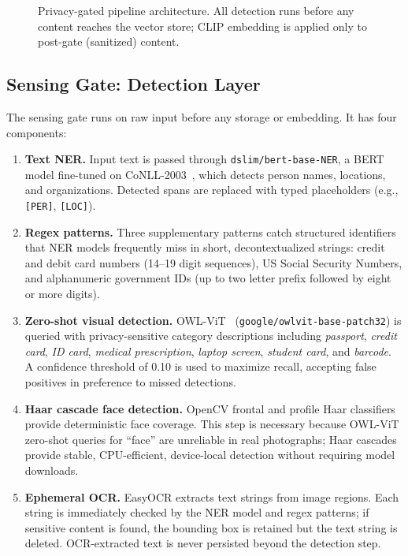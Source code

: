 \documentclass[11pt]{article}
\begin{document}
\begin{figure}[H]
\begin{tikzpicture}
\end{tikzpicture}
\caption{Privacy-gated pipeline architecture. All detection runs before any content reaches the
         vector store; CLIP embedding is applied only to post-gate (sanitized) content.}
\label{fig:pipeline}
\end{figure}

\subsection{Sensing Gate: Detection Layer}

The sensing gate runs on raw input before any storage or embedding. It has four components:

\begin{enumerate}[noitemsep]
    \item \textbf{Text NER.} Input text is passed through \texttt{dslim/bert-base-NER}, a BERT model fine-tuned on CoNLL-2003~\cite{tjong2003}, which detects person names, locations, and organizations. Detected spans are replaced with typed placeholders (e.g., \texttt{[PER]}, \texttt{[LOC]}).

    \item \textbf{Regex patterns.} Three supplementary patterns catch structured identifiers that NER models frequently miss in short, decontextualized strings: credit and debit card numbers (14--19 digit sequences), US Social Security Numbers, and alphanumeric government IDs (up to two letter prefix followed by eight or more digits).

    \item \textbf{Zero-shot visual detection.} OWL-ViT~\cite{owlvit} (\texttt{google/owlvit-base-patch32}) is queried with privacy-sensitive category descriptions including \textit{passport}, \textit{credit card}, \textit{ID card}, \textit{medical prescription}, \textit{laptop screen}, \textit{student card}, and \textit{barcode}. A confidence threshold of 0.10 is used to maximize recall, accepting false positives in preference to missed detections.

    \item \textbf{Haar cascade face detection.} OpenCV frontal and profile Haar classifiers provide deterministic face coverage. This step is necessary because OWL-ViT zero-shot queries for ``face'' are unreliable in real photographs; Haar cascades provide stable, CPU-efficient, device-local detection without requiring model downloads.

    \item \textbf{Ephemeral OCR.} EasyOCR extracts text strings from image regions. Each string is immediately checked by the NER model and regex patterns; if sensitive content is found, the bounding box is retained but the text string is deleted. OCR-extracted text is never persisted beyond the detection step.
\end{enumerate}
\end{document}

